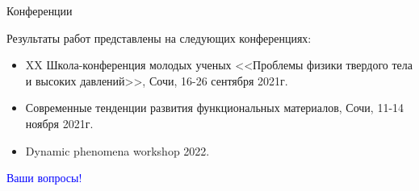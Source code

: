\documentclass{beamer}
\begin{document}
\begin{frame}{Конференции}
\footnotesize{


Результаты работ представлены на следующих конференциях:

\begin{itemize}
    \item XX Школа-конференция молодых ученых <<Проблемы физики твердого тела и высоких давлений>>, Сочи, 16-26 сентября 2021г.
    \item Современные тенденции развития функциональных материалов, Сочи, 11-14 ноября 2021г.
    \item Dynamic phenomena workshop 2022.
\end{itemize}

}
\end{frame}





\begin{frame}
    \centering \Huge \textcolor{blue}{Ваши вопросы!}
\end{frame}
\end{document}
